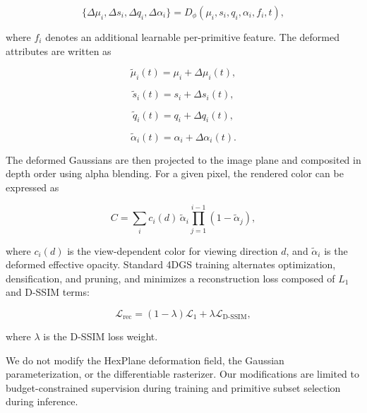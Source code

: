 \documentclass[pdflatex,sn-mathphys]{sn-jnl}
\begin{document}
\begin{equation}
\{\Delta \mu_i, \Delta s_i, \Delta q_i, \Delta \alpha_i\}
=
D_{\phi}(\mu_i, s_i, q_i, \alpha_i, f_i, t),
\label{eq:deformation}
\end{equation}

where $f_i$ denotes an additional learnable per-primitive feature. The deformed attributes are written as

\begin{equation}
\tilde{\mu}_i(t)=\mu_i+\Delta \mu_i(t),
\end{equation}

\begin{equation}
\tilde{s}_i(t)=s_i+\Delta s_i(t),
\end{equation}

\begin{equation}
\tilde{q}_i(t)=q_i+\Delta q_i(t),
\end{equation}

\begin{equation}
\tilde{\alpha}_i(t)=\alpha_i+\Delta \alpha_i(t).
\end{equation}

The deformed Gaussians are then projected to the image plane and composited in depth order using alpha blending. For a given pixel, the rendered color can be expressed as

\begin{equation}
C =
\sum_i c_i(d)\,\tilde{\alpha}_i
\prod_{j=1}^{i-1}(1-\tilde{\alpha}_j),
\label{eq:rendering}
\end{equation}

where $c_i(d)$ is the view-dependent color for viewing direction $d$, and $\tilde{\alpha}_i$ is the deformed effective opacity. Standard 4DGS training alternates optimization, densification, and pruning, and minimizes a reconstruction loss composed of $L_1$ and D-SSIM terms:

\begin{equation}
\mathcal{L}_{\mathrm{rec}}
=
(1-\lambda)\mathcal{L}_1
+
\lambda\mathcal{L}_{\mathrm{D\text{-}SSIM}},
\label{eq:loss}
\end{equation}

where $\lambda$ is the D-SSIM loss weight.

We do not modify the HexPlane deformation field, the Gaussian parameterization, or the differentiable rasterizer. Our modifications are limited to budget-constrained supervision during training and primitive subset selection during inference.
\end{document}
